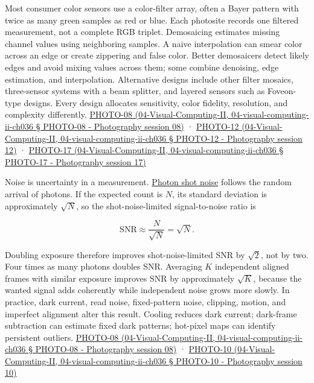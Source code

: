 Most consumer color sensors use a color-filter array, often a Bayer pattern with twice as many green samples as red or blue. Each photosite records one filtered measurement, not a complete RGB triplet. Demosaicing estimates missing channel values using neighboring samples. A naive interpolation can smear color across an edge or create zippering and false color. Better demosaicers detect likely edges and avoid mixing values across them; some combine denoising, edge estimation, and interpolation. Alternative designs include other filter mosaics, three-sensor systems with a beam splitter, and layered sensors such as Foveon-type designs. Every design allocates sensitivity, color fidelity, resolution, and complexity differently. \href{}{PHOTO-08 (04-Visual-Computing-II, 04-visual-computing-ii-ch036 § PHOTO-08 - Photography session 08)} · \href{}{PHOTO-12 (04-Visual-Computing-II, 04-visual-computing-ii-ch036 § PHOTO-12 - Photography session 12)} · \href{}{PHOTO-17 (04-Visual-Computing-II, 04-visual-computing-ii-ch036 § PHOTO-17 - Photography session 17)}

Noise is uncertainty in a measurement. \hyperref[appendix-92d45cdf2afc]{Photon shot noise} follows the random arrival of photons. If the expected count is \(N\), its standard deviation is approximately \(\sqrt{N}\), so the shot-noise-limited signal-to-noise ratio is

\[
\mathrm{SNR}\approx\frac{N}{\sqrt{N}}=\sqrt{N}.
\]

Doubling exposure therefore improves shot-noise-limited SNR by \(\sqrt 2\), not by two. Four times as many photons doubles SNR. Averaging \(K\) independent aligned frames with similar exposure improves SNR by approximately \(\sqrt K\), because the wanted signal adds coherently while independent noise grows more slowly. In practice, dark current, read noise, fixed-pattern noise, clipping, motion, and imperfect alignment alter this result. Cooling reduces dark current; dark-frame subtraction can estimate fixed dark patterns; hot-pixel maps can identify persistent outliers. \href{}{PHOTO-08 (04-Visual-Computing-II, 04-visual-computing-ii-ch036 § PHOTO-08 - Photography session 08)} · \href{}{PHOTO-10 (04-Visual-Computing-II, 04-visual-computing-ii-ch036 § PHOTO-10 - Photography session 10)}

